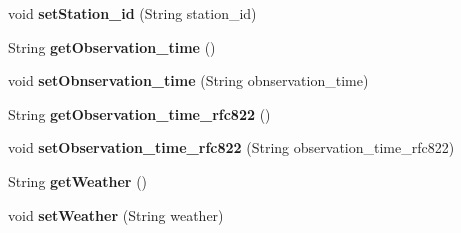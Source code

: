 \begin{DoxyCompactItemize}
\item 
\hypertarget{classgov_1_1fnal_1_1ppd_1_1dd_1_1xml_1_1news_1_1current__observation_a81e08e525a7e260026a19bfbb96bf0e9}{void {\bfseries set\-Station\-\_\-id} (String station\-\_\-id)}\label{classgov_1_1fnal_1_1ppd_1_1dd_1_1xml_1_1news_1_1current__observation_a81e08e525a7e260026a19bfbb96bf0e9}

\item 
\hypertarget{classgov_1_1fnal_1_1ppd_1_1dd_1_1xml_1_1news_1_1current__observation_a06e03f0aba91701d539cc733686d7893}{String {\bfseries get\-Observation\-\_\-time} ()}\label{classgov_1_1fnal_1_1ppd_1_1dd_1_1xml_1_1news_1_1current__observation_a06e03f0aba91701d539cc733686d7893}

\item 
\hypertarget{classgov_1_1fnal_1_1ppd_1_1dd_1_1xml_1_1news_1_1current__observation_a5dd4f6432217154ed7fd55a31edec01e}{void {\bfseries set\-Obnservation\-\_\-time} (String obnservation\-\_\-time)}\label{classgov_1_1fnal_1_1ppd_1_1dd_1_1xml_1_1news_1_1current__observation_a5dd4f6432217154ed7fd55a31edec01e}

\item 
\hypertarget{classgov_1_1fnal_1_1ppd_1_1dd_1_1xml_1_1news_1_1current__observation_a1b399e6a04eb87ac578567c3ee1b3963}{String {\bfseries get\-Observation\-\_\-time\-\_\-rfc822} ()}\label{classgov_1_1fnal_1_1ppd_1_1dd_1_1xml_1_1news_1_1current__observation_a1b399e6a04eb87ac578567c3ee1b3963}

\item 
\hypertarget{classgov_1_1fnal_1_1ppd_1_1dd_1_1xml_1_1news_1_1current__observation_a04135c021c372ef60cf983bfb1b1a6fb}{void {\bfseries set\-Observation\-\_\-time\-\_\-rfc822} (String observation\-\_\-time\-\_\-rfc822)}\label{classgov_1_1fnal_1_1ppd_1_1dd_1_1xml_1_1news_1_1current__observation_a04135c021c372ef60cf983bfb1b1a6fb}

\item 
\hypertarget{classgov_1_1fnal_1_1ppd_1_1dd_1_1xml_1_1news_1_1current__observation_af7f6d3e41f20d20d1ebe1b1577ddf885}{String {\bfseries get\-Weather} ()}\label{classgov_1_1fnal_1_1ppd_1_1dd_1_1xml_1_1news_1_1current__observation_af7f6d3e41f20d20d1ebe1b1577ddf885}

\item 
\hypertarget{classgov_1_1fnal_1_1ppd_1_1dd_1_1xml_1_1news_1_1current__observation_a1e984358899503fda1267302f6e57888}{void {\bfseries set\-Weather} (String weather)}\label{classgov_1_1fnal_1_1ppd_1_1dd_1_1xml_1_1news_1_1current__observation_a1e984358899503fda1267302f6e57888}


\end{DoxyCompactItemize}
